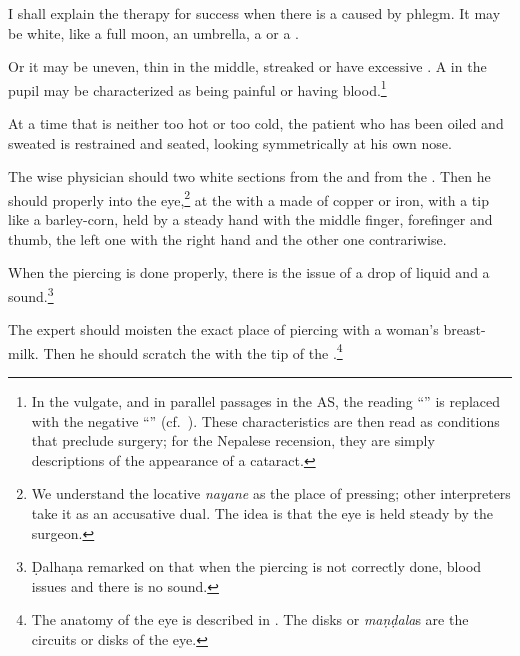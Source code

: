 \begin{translation}
    
    \item [49]
    
    I shall explain the therapy for success when there is a 
    caused by phlegm.   It may be white, like a full moon, an umbrella, a
     or a .
    
    \item [50] Or it may be uneven, thin in the middle, streaked or have excessive
    . A  in the pupil may be characterized as being
    painful or having blood.\footnote{In the vulgate, and in parallel passages in the
    AS, the reading “” is replaced with the negative “” (cf.\ ).   These characteristics are then
    read as conditions that preclude surgery;  for the Nepalese recension, they are
    simply descriptions of the appearance of a cataract.}
    
    \item [51--52]
    
    At a time that is neither too hot or too cold, 
    the patient who has been oiled and sweated
    is restrained and seated, looking symmetrically at his own nose.
    
    The wise physician should  two white sections from the
     and from the . 
    Then he should 
     properly into the eye,\footnote{We 
    understand the
    locative \emph{nayane} as the place of pressing; other interpreters take it as an
    accusative dual.  The idea is that the eye is held steady by the surgeon.} at the
      with a
    made of copper or iron, with a tip like a barley-corn, held by a steady
    hand with the middle finger, forefinger and thumb,
    the left one with the right hand and the other one contrariwise.
    
    When the piercing is done properly, there is the issue of a drop of liquid and
a sound.\footnote{Ḍalhaṇa  remarked on  that when the
piercing is not correctly done, blood issues and there is no sound.} %
%
    
    \item [55]
    
    The expert should moisten the exact place of piercing  with a woman's breast-milk.  Then 
    he 
    should scratch the  with the tip of the 
    .\footnote{The anatomy of the eye is described in 
    .
    The disks or 
    \emph{maṇḍala}s are the circuits or disks of the eye.}
    

\end{translation}
